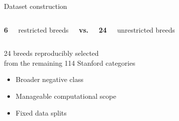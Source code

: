 \documentclass[aspectratio=169,11pt]{beamer}
\newcommand{\stepitem}{\item<+->}
\newcommand{\stepitem}{\item}
\begin{document}

\begin{frame}{Dataset construction}

\vspace{-0.25em}

\begin{columns}[c,onlytextwidth]


\centering

{\fontsize{36}{40}\selectfont\bfseries 6}

\vspace{0.08em}

{\large restricted breeds}


\centering
{\Large\bfseries vs.}


\centering

{\fontsize{36}{40}\selectfont\bfseries 24}

\vspace{0.08em}

{\large unrestricted breeds}

\end{columns}

\vspace{0.6em}

\centering

{\normalsize
24 breeds reproducibly selected\\
from the remaining 114 Stanford categories
}

\vspace{0.55em}

\begin{center}
\begin{minipage}{0.68\textwidth}

\begin{itemize}
  \setlength{\itemsep}{0.42em}

  \stepitem Broader negative class
  \stepitem Manageable computational scope
  \stepitem Fixed data splits
\end{itemize}

\end{minipage}
\end{center}

\end{frame}
\end{document}
